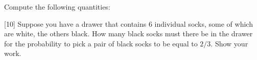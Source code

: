 % 
% 

Compute the following quantities:
\newpage
[10]
Suppose you have a drawer that contains 6 individual socks, some of which are white, the others black. How many black socks must there be in the drawer for the probability to pick a pair of black socks to be equal to $2/3$. Show your work.
\newpage